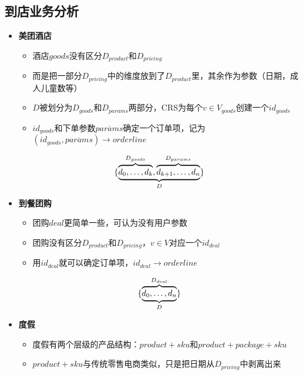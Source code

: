 \documentclass[a4paper]{article}
\begin{document}
\subsection{到店业务分析}
\begin{itemize}
    \item \textbf{美团酒店}
        \begin{itemize}
            \item 酒店$goods$没有区分$D_{product}$和$D_{pricing}$
            \item 而是把一部分$D_{pricing}$中的维度放到了$D_{product}$里，其余作为参数（日期，成人儿童数等）
            \item $D$被划分为$D_{goods}$和$D_{params}$两部分，CRS为每个$v \in V_{goods}$创建一个$id_{goods}$
            \item $id_{goods}$和下单参数$\overline{params}$确定一个订单项，记为$(id_{goods}, \overline{params}) \longrightarrow orderline$
        \end{itemize}
        \begin{equation}
            \{\underbrace{%
                \overbrace{\mathstrut d_0,\ldots,d_k}^{D_{goods}},
                \overbrace{\mathstrut d_{k+1},\ldots,d_n}^{D_{params}}
            }
            _{D} \}
        \end{equation}
    \item \textbf{到餐团购}
        \begin{itemize}
            \item 团购$deal$更简单一些，可认为没有用户参数
            \item 团购没有区分$D_{product}$和$D_{pricing}$，$v \in V$对应一个$id_{deal}$
            \item 用$id_{deal}$就可以确定订单项，$id_{deal} \longrightarrow orderline$
        \end{itemize}
        \begin{equation}
            \{\underbrace{%
                \overbrace{\mathstrut d_0,\ldots,d_n}^{D_{deal}}
            }
            _{D} \}
        \end{equation}        
    \item \textbf{度假}
        \begin{itemize}
            \item 度假有两个层级的产品结构：$product+sku$和$product+package+sku$
            \item $product+sku$与传统零售电商类似，只是把日期从$D_{pricing}$中剥离出来
            \begin{enumerate}

\end{enumerate}
\end{itemize}
\end{itemize}
\end{document}
